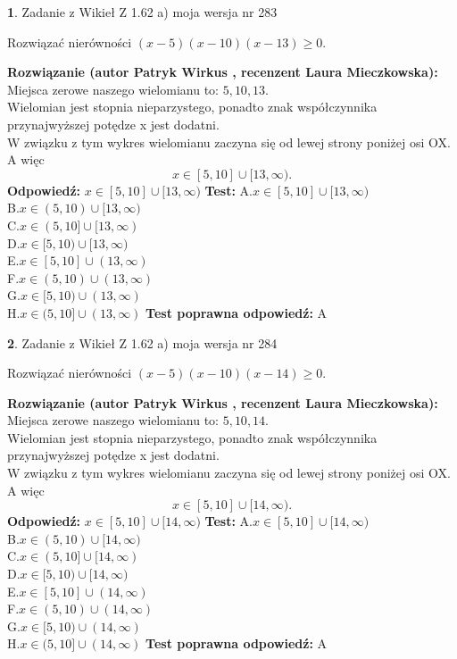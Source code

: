 \documentclass[12pt, a4paper]{article}
\theoremstyle{definition} %
\newtheorem{zad}{}
\newcommand{\zadStart}[1]{\begin{zad}#1\newline}
\newcommand{\zadStop}{\end{zad}}
\newcommand{\rozwStart}[2]{\noindent \textbf{Rozwiązanie (autor #1 , recenzent #2): }\newline}
\newcommand{\rozwStop}{\newline}
\newcommand{\odpStart}{\noindent \textbf{Odpowiedź:}\newline}
\newcommand{\odpStop}{\newline}
\newcommand{\testStart}{\noindent \textbf{Test:}\newline}
\newcommand{\testStop}{\newline}
\newcommand{\kluczStart}{\noindent \textbf{Test poprawna odpowiedź:}\newline}
\newcommand{\kluczStop}{\newline}
\begin{document}
\zadStart{Zadanie z Wikieł Z 1.62 a) moja wersja nr 283}

Rozwiązać nierówności $(x-5)(x-10)(x-13)\ge0$.
\zadStop
\rozwStart{Patryk Wirkus}{Laura Mieczkowska}
Miejsca zerowe naszego wielomianu to: $5, 10, 13$.\\
Wielomian jest stopnia nieparzystego, ponadto znak współczynnika przy\linebreak najwyższej potędze x jest dodatni.\\ W związku z tym wykres wielomianu zaczyna się od lewej strony poniżej osi OX. A więc $$x \in [5,10] \cup [13,\infty).$$
\rozwStop
\odpStart
$x \in [5,10] \cup [13,\infty)$
\odpStop
\testStart
A.$x \in [5,10] \cup [13,\infty)$\\
B.$x \in (5,10) \cup [13,\infty)$\\
C.$x \in (5,10] \cup [13,\infty)$\\
D.$x \in [5,10) \cup [13,\infty)$\\
E.$x \in [5,10] \cup (13,\infty)$\\
F.$x \in (5,10) \cup (13,\infty)$\\
G.$x \in [5,10) \cup (13,\infty)$\\
H.$x \in (5,10] \cup (13,\infty)$
\testStop
\kluczStart
A
\kluczStop



\zadStart{Zadanie z Wikieł Z 1.62 a) moja wersja nr 284}

Rozwiązać nierówności $(x-5)(x-10)(x-14)\ge0$.
\zadStop
\rozwStart{Patryk Wirkus}{Laura Mieczkowska}
Miejsca zerowe naszego wielomianu to: $5, 10, 14$.\\
Wielomian jest stopnia nieparzystego, ponadto znak współczynnika przy\linebreak najwyższej potędze x jest dodatni.\\ W związku z tym wykres wielomianu zaczyna się od lewej strony poniżej osi OX. A więc $$x \in [5,10] \cup [14,\infty).$$
\rozwStop
\odpStart
$x \in [5,10] \cup [14,\infty)$
\odpStop
\testStart
A.$x \in [5,10] \cup [14,\infty)$\\
B.$x \in (5,10) \cup [14,\infty)$\\
C.$x \in (5,10] \cup [14,\infty)$\\
D.$x \in [5,10) \cup [14,\infty)$\\
E.$x \in [5,10] \cup (14,\infty)$\\
F.$x \in (5,10) \cup (14,\infty)$\\
G.$x \in [5,10) \cup (14,\infty)$\\
H.$x \in (5,10] \cup (14,\infty)$
\testStop
\kluczStart
A
\kluczStop
\end{document}
